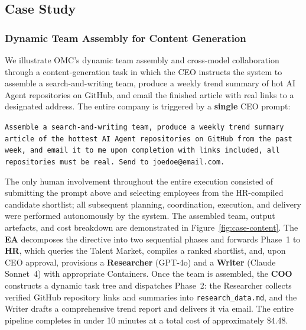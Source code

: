 \documentclass[11pt,a4paper]{article}
\begin{document}
\subsection{Case Study}

\subsubsection{Dynamic Team Assembly for Content Generation}
\label{sec:case-content}

We illustrate OMC's dynamic team assembly and cross-model collaboration through a
content-generation task in which the CEO instructs the system to assemble a
search-and-writing team, produce a weekly trend summary of hot AI Agent repositories
on GitHub, and email the finished article with real links to a designated address.
The entire company is triggered by a \textbf{single} CEO prompt:

\begin{mdframed}[
nobreak=true,
  linewidth=0.8pt,
  linecolor=black!40,
  backgroundcolor=black!2,
  innertopmargin=10pt,
  innerbottommargin=10pt,
  innerleftmargin=14pt,
  innerrightmargin=14pt,
  roundcorner=4pt
]
\sloppy
\noindent\texttt{Assemble a search-and-writing team, produce a weekly trend summary article of the hottest AI Agent repositories on GitHub from the past week, and email it to me upon completion with links included, all repositories must be real. Send to joedoe@email.com.}
\end{mdframed}

\noindent The only human involvement throughout the entire execution consisted of submitting the prompt above and selecting employees from the HR-compiled candidate shortlist; all subsequent planning, coordination,
execution, and delivery were performed autonomously by the system. The assembled team, output artefacts, and cost breakdown are demonstrated in Figure~\ref{fig:case-content}. The \textbf{EA} decomposes the directive into two sequential phases and forwards
Phase~1 to \textbf{HR}, which queries the Talent Market, compiles a ranked shortlist,
and, upon CEO approval, provisions a \textbf{Researcher} (GPT-4o) and a
\textbf{Writer} (Claude Sonnet~4) with appropriate Containers.
Once the team is assembled, the \textbf{COO} constructs a dynamic task tree and
dispatches Phase~2: the Researcher collects verified GitHub repository links and
summaries into \texttt{research\_data.md}, and the Writer drafts a comprehensive
trend report and delivers it via email. The entire pipeline completes in under
10 minutes at a total cost of approximately \$4.48.
\end{document}
